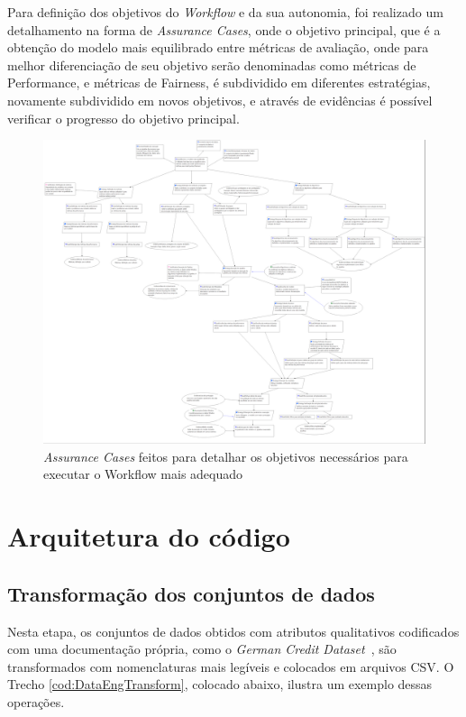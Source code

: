 \documentclass[portugues]{ic-tese}
\begin{document}
Para definição dos objetivos do \textit{Workflow} e da sua autonomia, foi realizado um detalhamento na forma de \textit{Assurance Cases}, onde o objetivo principal, que é a obtenção do modelo mais equilibrado entre métricas de avaliação, onde para melhor diferenciação de seu objetivo serão denominadas como métricas de Performance, e métricas de Fairness, é subdividido em diferentes estratégias, novamente subdividido em novos objetivos, e através de evidências é possível verificar o progresso do objetivo principal.

\begin{figure}[H]
\centering
\includegraphics[scale=0.1]{images/assurancecase.jpg}
\caption {\textit{Assurance Cases} feitos para detalhar os objetivos necessários para executar o Workflow mais adequado}
\label{fig:AssuranceCase}
\end{figure}

\section{Arquitetura do código}

\subsection{Transformação dos conjuntos de dados}

Nesta etapa, os conjuntos de dados obtidos com atributos qualitativos codificados com uma documentação própria, como o \textit{German Credit Dataset}~\citep{ucigerman_2021}, são transformados com nomenclaturas mais legíveis e colocados em arquivos CSV. O Trecho \ref{cod:DataEngTransform}, colocado abaixo, ilustra um exemplo dessas operações.
\end{document}
